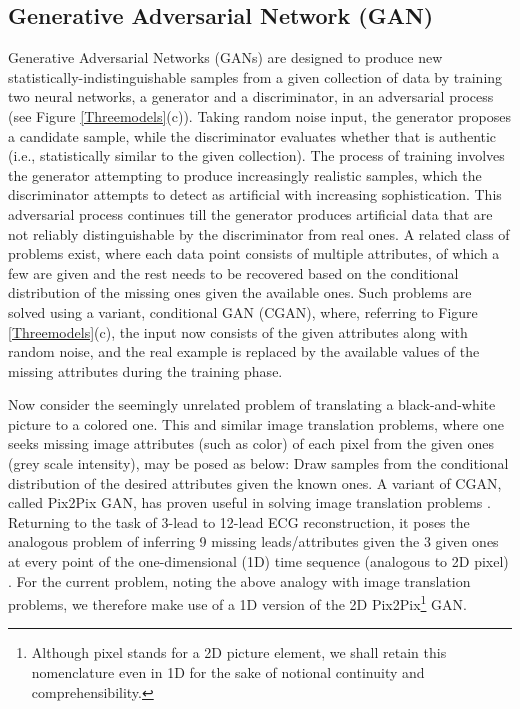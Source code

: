 \documentclass[conference]{IEEEtran}
\begin{document}
\subsection{Generative Adversarial Network (GAN)}

Generative Adversarial Networks (GANs) are designed to produce new statistically-indistinguishable samples from a given collection of data by training two neural networks, a generator and a discriminator, in an adversarial process (see Figure \ref{Threemodels}(c)). Taking random noise input, the generator proposes a candidate sample, while the discriminator evaluates whether that is authentic (i.e., statistically similar to the given collection). The process of training involves the generator attempting to produce increasingly realistic samples, which the discriminator attempts to detect as artificial with increasing sophistication. This adversarial process continues till the generator produces artificial data that are not reliably distinguishable by the discriminator from real ones. A related class of problems exist, where each data point consists of multiple attributes, of which a few are given and the rest needs to be recovered based on the conditional distribution of the missing ones given the available ones. Such problems are solved using a variant, conditional GAN (CGAN), where, referring to Figure \ref{Threemodels}(c), the input now consists of the given attributes along with random noise, and the real example is replaced by the available values of the missing attributes during the training phase.  

Now consider the seemingly unrelated problem of translating a black-and-white picture to a colored one. This and similar image translation problems, where one seeks missing image attributes (such as color) of each pixel from the given ones (grey scale intensity), may be posed as below: Draw samples from the conditional distribution of the desired attributes given the known ones. 
A variant of CGAN, called Pix2Pix GAN, has proven useful in solving image translation problems \cite{ganconditional}. Returning to the task of 3-lead to 12-lead ECG reconstruction, it poses the analogous problem of inferring 9 missing leads/attributes given the 3 given ones at every point of the one-dimensional (1D) time sequence (analogous to 2D pixel) \cite{gantimeseries}. For the current problem, noting the above analogy with image translation problems, we therefore make use of a 1D version of the 2D Pix2Pix\footnote{Although pixel stands for a 2D picture element, we shall retain this nomenclature even in 1D for the sake of notional continuity and comprehensibility.} GAN.  
\end{document}
